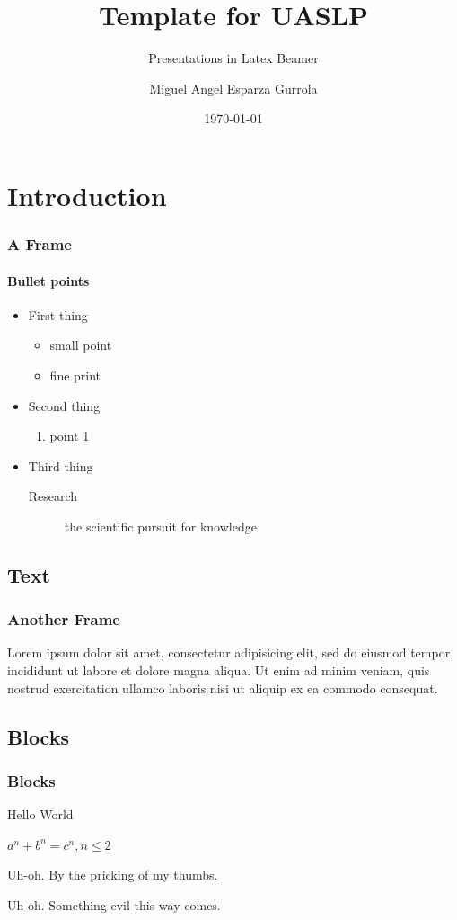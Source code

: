 \documentclass{beamer}
\title{Template for UASLP}
\subtitle{Presentations in Latex Beamer}
\author{Miguel Angel Esparza Gurrola}
\date{\today}
\institute{\url{miesparza@hotmail.com}}
\begin{document}
\begin{frame}[plain,t]
\titlepage
\end{frame}


\section{Introduction}
\begin{frame}
\frametitle{A Frame}
\framesubtitle{Bullet points}
\begin{itemize}
\item First thing
	\begin{itemize}
	\item small point
	\item fine print
	\end{itemize}
\item Second thing
	\begin{enumerate}
	\item point 1
	\end{enumerate}
\item Third thing
	\begin{description}
	\item[Research] the scientific pursuit for knowledge
	\end{description}
\end{itemize}
\end{frame}

\subsection{Text}
\begin{frame}
\frametitle{Another Frame}
Lorem ipsum dolor sit amet, consectetur adipisicing elit, sed do eiusmod tempor incididunt ut labore et dolore magna aliqua. Ut enim ad minim veniam, quis nostrud exercitation ullamco laboris nisi ut aliquip ex ea commodo consequat.
\end{frame}

\subsection{Blocks}
\begin{frame}
\frametitle{Blocks}
\begin{definition}[Greetings]
Hello World
\end{definition}

\begin{theorem}
$a^n + b^n = c^n, n \leq 2$
\end{theorem}

\begin{alertblock}{Uh-oh.}
By the pricking of my thumbs.
\end{alertblock}

\begin{exampleblock}{Uh-oh.}
Something evil this way comes.
\end{exampleblock}

\end{frame}

\ThankYouFrame
\end{document}
